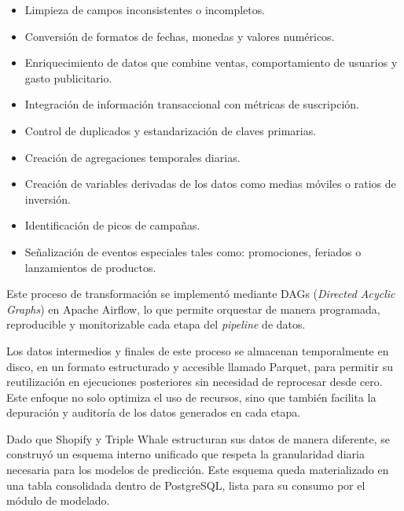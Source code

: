 \begin{itemize}

\item Limpieza de campos inconsistentes o incompletos.

\item Conversión de formatos de fechas, monedas y valores numéricos.

\item Enriquecimiento de datos que combine ventas, comportamiento de usuarios y gasto publicitario.

\item Integración de información transaccional con métricas de suscripción.

\item Control de duplicados y estandarización de claves primarias.

\item Creación de agregaciones temporales diarias.
 
\item Creación de variables derivadas de los datos como medias móviles o ratios de inversión.

\item Identificación de picos de campañas.

\item Señalización de eventos especiales tales como: promociones, feriados o lanzamientos de productos.

\end{itemize}

Este proceso de transformación se implementó mediante DAGs (\textit{Directed Acyclic Graphs}) en Apache Airflow, lo que permite orquestar de manera programada, reproducible y monitorizable cada etapa del \textit{pipeline} de datos.

Los datos intermedios y finales de este proceso se almacenan temporalmente en disco, en un formato estructurado y accesible llamado Parquet, para permitir su reutilización en ejecuciones posteriores sin necesidad de reprocesar desde cero. Este enfoque no solo optimiza el uso de recursos, sino que también facilita la depuración y auditoría de los datos generados en cada etapa.

Dado que Shopify y Triple Whale estructuran sus datos de manera diferente, se construyó un esquema interno unificado que respeta la granularidad diaria necesaria para los modelos de predicción. Este esquema queda materializado en una tabla consolidada dentro de PostgreSQL, lista para su consumo por el módulo de modelado.

